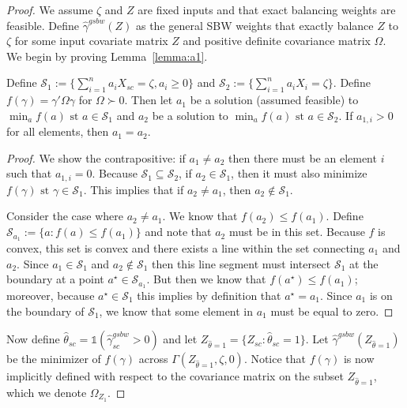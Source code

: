 \begin{proof}
We assume $\zeta$ and $Z$ are fixed inputs and that exact balancing weights are feasible. Define $\hat{\gamma}^{gsbw}(Z)$ as the general SBW weights that exactly balance $Z$ to $\zeta$ for some input covariate matrix $Z$ and positive definite covariance matrix $\Omega$. We begin by proving Lemma~\ref{lemma:a1}.

\begin{lemma}\label{lemma:a1}
    Define $\mathcal{S}_1 := \{\sum_{i=1}^n a_{i}X_{sc} = \zeta, a_{i} \ge 0\}$ and $\mathcal{S}_2 := \{\sum_{i=1}^n a_{i}X_{i} = \zeta\}$. Define $f(\gamma) = \gamma'\Omega\gamma$ for $\Omega \succ 0$. Then let $a_1$ be a solution (assumed feasible) to $\min_a f(a) \text{ st } a \in \mathcal{S}_1$ and $a_2$ be a solution to $\min_a f(a) \text{ st } a \in \mathcal{S}_2$. If $a_{1, i} > 0$ for all elements, then $a_1 = a_2$.
\end{lemma}

\begin{proof}
    We show the contrapositive: if $a_1 \ne a_2$ then there must be an element $i$ such that $a_{1, i} = 0$. Because $\mathcal{S}_1 \subseteq \mathcal{S}_2$, if $a_2 \in \mathcal{S}_1$, then it must also minimize $f(\gamma) \text{ st } \gamma \in \mathcal{S}_1$. This implies that if $a_2 \ne a_1$, then $a_2 \not\in \mathcal{S}_1$.
    
    Consider the case where $a_2 \ne a_1$. We know that $f(a_2) \le f(a_1)$. Define $\mathcal{S}_{a_1} := \{a: f(a) \le f(a_1)\}$ and note that $a_2$ must be in this set. Because $f$ is convex, this set is convex and there exists a line within the set connecting $a_1$ and $a_2$. Since $a_1 \in \mathcal{S}_1$ and $a_2 \not\in\mathcal{S}_1$ then this line segment must intersect $\mathcal{S}_1$ at the boundary at a point $a^\star \in \mathcal{S}_{a_1}$. But then we know that $f(a^\star) \le f(a_1)$; moreover, because $a^\star \in \mathcal{S}_1$ this implies by definition that $a^\star = a_1$. Since $a_1$ is on the boundary of $\mathcal{S}_1$, we know that some element in $a_1$ must be equal to zero. 
\end{proof}

Now define $\hat{\theta}_{sc} = \mathds{1}(\hat{\gamma}_{sc}^{gsbw} > 0)$ and let $Z_{\hat{\theta} = 1} = \{Z_{sc}: \hat{\theta}_{sc} = 1\}$. Let $\hat{\gamma}^{gsbw}(Z_{\hat{\theta} = 1})$ be the minimizer of $f(\gamma)$ across $\Gamma(Z_{\hat{\theta} = 1}, \zeta, 0)$. Notice that $f(\gamma)$ is now implicitly defined with respect to the covariance matrix on the subset $Z_{\hat{\theta} = 1}$, which we denote $\Omega_{Z_1}$. 


\end{proof}
